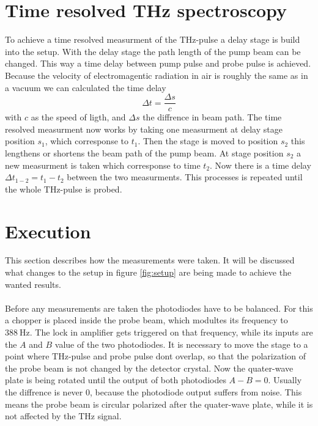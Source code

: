 \section{Time resolved THz spectroscopy}
\label{sec:time_domain}
To achieve a time resolved measurment of the $\si{\tera\hertz}$-pulse a delay stage is build into the setup.
With the delay stage the path length of the pump beam can be changed.
This way a time delay between pump pulse and probe pulse is achieved.
Because the velocity of electromagentic radiation in air is roughly the same as in a vacuum we can calculated the time delay   
\begin{equation}
    \Delta t = \frac{\Delta s}{c}
\end{equation}
with $c$ as the speed of ligth, and $\Delta s$ the diffrence in beam path.
The time resolved measurment now works by taking one measurment at delay stage position $s_1$, which corresponse to $t_1$.
Then the stage is moved to position $s_2$ this lengthens or shortens the beam path of the pump beam.
At stage position $s_2$ a new measurment is taken which corresponse to time $t_2$.
Now there is a time delay $\Delta t_{1-2} = t_1 - t_2$ between the two measurments.
This processes is repeated until the whole $\si{\tera\hertz}$-pulse is probed.

\section{Execution}
This section describes how the measurements were taken. 
It will be discussed what changes to the setup in figure \ref{fig:setup} are being made to achieve the wanted results.
\\\\
Before any measurements are taken the photodiodes have to be balanced.
For this a chopper is placed inside the probe beam, which modultes its frequency to $\SI{388}{\hertz}$.
The lock in amplifier gets triggered on that frequency, while its inputs are the $A$ and $B$ value of the two photodiodes.
It is necessary to move the stage to a point where $\si{\tera\hertz}$-pulse and probe pulse dont overlap, so that the polarization of the probe beam is not changed by the detector crystal.
Now the quater-wave plate is being rotated until the output of both photodiodes $A-B = 0$.
Usually the diffrence is never 0, because the photodiode output suffers from noise. 
This means the probe beam is circular polarized after the quater-wave plate, while it is not affected by the $\si{\tera\hertz}$ signal.
